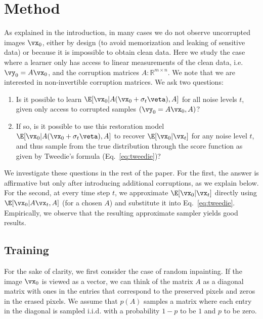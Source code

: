 \documentclass{article}
\begin{document}
\section{Method}\label{sec:method}
As explained in the introduction, in many cases we do not observe uncorrupted images $\vx_0$, either by design (to avoid memorization and leaking of sensitive data) or because it is impossible to obtain clean data. Here we study the case where a learner only has access to linear measurements of the clean data, i.e. $\vy_0 = A\vx_0$, and the corruption matrices $A:\mathbb R^{m\times n}$. We note that we are interested in non-invertible corruption matrices. We ask two questions:
\begin{enumerate}
    \item Is it possible to learn $\E[\vx_0 | A(\vx_0 + \sigma_t\veta), A]$ for all noise levels $t$, given only access to corrupted samples $(\vy_0=A\vx_0, A)$?
    \item If so, is it possible to use this restoration model $\E[\vx_0 | A(\vx_0 + \sigma_t\veta), A]$ to recover $\E[\vx_0 | \vx_t]$ for any noise level $t$, and thus sample from the true distribution through the score function as given by Tweedie's formula (Eq.~\ref{eq:tweedie})?
\end{enumerate}
We investigate these questions in the rest of the paper.
For the first, the answer is affirmative but only after introducing additional corruptions, as we explain below.  For the second, at every time step $t$, we approximate $\E[\vx_0|\vx_t]$ directly using $\E[\vx_0|A\vx_t, A]$ (for a chosen $A$) and substitute it into Eq.~\ref{eq:tweedie}. Empirically, we observe that the resulting approximate sampler yields good results.

\subsection{Training}\label{subsec:training}
For the sake of clarity, we first consider the case of random inpainting. If the image $\vx_0$ is viewed as a vector, we can think of the matrix $A$ as a diagonal matrix with ones in the entries that correspond to the preserved pixels and zeros in the erased pixels. We assume that $p(A)$ samples a matrix where each entry in the diagonal is sampled i.i.d. with a probability $1-p$ to be $1$ and $p$ to be zero. %
\end{document}
